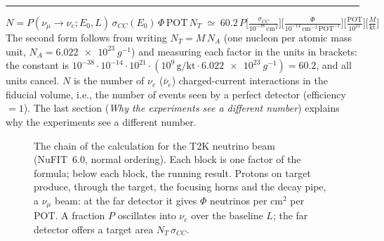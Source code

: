 \documentclass[11pt,a4paper]{article}
\begin{document}
\vspace{1ex}\hrule\vspace{2ex}

\begin{equation*}
  N = P(\nu_\mu\to\nu_e; E_0, L)\, \sigma_{CC}(E_0)\, \Phi\, \mathrm{POT}\, N_T
  \;\simeq\; 60.2\,P
  \Big[\tfrac{\sigma_{CC}}{10^{-38}\,\mathrm{cm^2}}\Big]
  \Big[\tfrac{\Phi}{10^{-14}\,\mathrm{cm^{-2}\,POT^{-1}}}\Big]
  \Big[\tfrac{\mathrm{POT}}{10^{21}}\Big]
  \Big[\tfrac{M}{\mathrm{kt}}\Big]
\end{equation*}
The second form follows from writing $N_T = M\,N_A$ (one nucleon per atomic mass unit, $N_A = \SI{6.022e23}{g^{-1}}$)
and measuring each factor in the units in brackets: the constant is
$10^{-38}\cdot10^{-14}\cdot10^{21}\cdot(10^{9}\,\mathrm{g/kt}\cdot\SI{6.022e23}{g^{-1}}) = 60.2$, and all units cancel.
$N$ is the number of $\nu_e$ ($\bar\nu_e$) charged-current interactions in the fiducial volume, i.e., the number of
events seen by a perfect detector (efficiency $=1$). The last section (\emph{Why the experiments see a different number})
explains why the experiments see a different number.

\begin{figure}[!htb]
  \centering
  \resizebox{\textwidth}{!}{}
  \caption{The chain of the calculation for the T2K neutrino beam (NuFIT~6.0, normal ordering). Each block is one factor
  of the formula; below each block, the running result. Protons on target produce, through the target, the focusing
  horns and the decay pipe, a $\nu_\mu$ beam: at the far detector it gives $\Phi$ neutrinos per cm$^2$ per POT. A fraction
  $P$ oscillates into $\nu_e$ over the baseline $L$; the far detector offers a target area $N_T\,\sigma_{CC}$.}
  \label{fig:scheme}
\end{figure}
\end{document}
